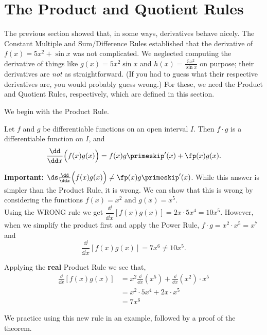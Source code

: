 \section{The Product and Quotient Rules}\label{sec:prod_quot_rules}

The previous section showed that, in some ways, derivatives behave nicely. The Constant Multiple and Sum/Difference Rules established that the derivative of $f(x) = 5x^2+\sin x $ was not complicated. We neglected computing the derivative of things like $g(x) = 5x^2\sin x$ and $h(x) = \frac{5x^2}{\sin x}$ on purpose; their derivatives are \emph{not} as straightforward. (If you had to guess what their respective derivatives are, you would probably guess wrong.) For these, we need the Product and Quotient Rules, respectively, which are defined in this section. 

We begin with the Product Rule.

\begin{theorem}\label{thm:ProductRule}
Let $f$ and $g$ be differentiable functions on an open interval $I$. Then $f\cdot g$ is a differentiable function on $I$, and
\[\frac{\dd}{\dd x}\Bigl(f(x)g(x)\Bigr) = f(x)g\primeskip'(x) + \fp(x)g(x).\]
\end{theorem}

\textbf{Important:} $\ds\frac{\dd}{\dd x}\Bigl(f(x)g(x)\Bigr) \neq \fp(x)g\primeskip'(x)$. While this answer is simpler than the Product Rule, it is wrong.  We can show that this is wrong by considering the functions
$f(x)=x^2$ and $g(x)=x^5$. \\
Using the WRONG rule we get $\dfrac{\dd}{\dd x}[f(x)g(x)] =2x \cdot 5x^4 = 10x^5$. However, when we simplify the product first and apply the Power Rule, $f \cdot g = x^2 \cdot x^5 = x^7$ and 
\[\frac{\dd}{\dd x}[f(x)g(x)] = 7x^6 \neq 10x^5.\]

Applying the \textbf{real} Product Rule we see that,
\begin{align*}
\frac{\dd}{\dd x}[f(x)g(x)]
& = x^2 \frac{\dd}{\dd x} (x^5) + \frac{\dd}{\dd x} (x^2) \cdot x^5 \\
& = x^2 \cdot 5x^4+2x \cdot x^5 \\
&= 7x^6
\end{align*}


We practice using this new rule in an example, followed by a proof of the theorem.

